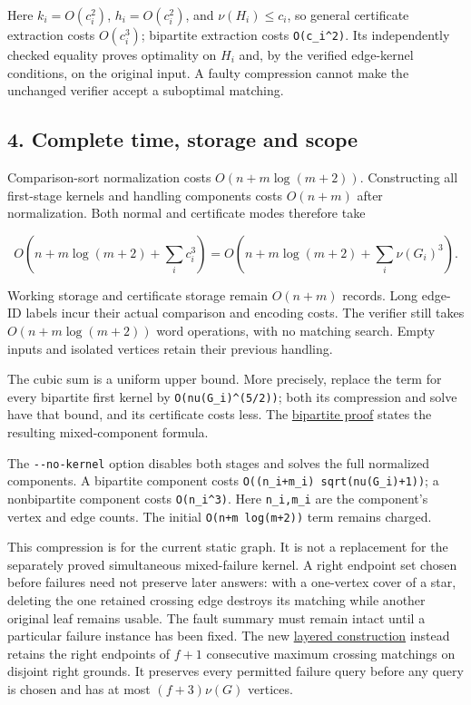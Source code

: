 Here \(k_i=O(c_i^2)\), \(h_i=O(c_i^2)\), and \(\nu(H_i)\leq c_i\), so general certificate extraction costs \(O(c_i^3)\); bipartite extraction costs \texttt{O(c\_i\^{}2)}. Its independently checked equality proves optimality on \(H_i\) and, by the verified edge-kernel conditions, on the original input. A faulty compression cannot make the unchanged verifier accept a suboptimal matching.

\hypertarget{af-e51d4b9b02-complete-time-storage-and-scope}{%
\subsection{4. Complete time, storage and scope}\label{af-e51d4b9b02-complete-time-storage-and-scope}}

Comparison-sort normalization costs \(O(n+m\log(m+2))\). Constructing all first-stage kernels and handling components costs \(O(n+m)\) after normalization. Both normal and certificate modes therefore take

\[
O\!\left(n+m\log(m+2)+\sum_i c_i^3\right)
=O\!\left(n+m\log(m+2)+\sum_i\nu(G_i)^3\right).
\]

Working storage and certificate storage remain \(O(n+m)\) records. Long edge-ID labels incur their actual comparison and encoding costs. The verifier still takes \(O(n+m\log(m+2))\) word operations, with no matching search. Empty inputs and isolated vertices retain their previous handling.

The cubic sum is a uniform upper bound. More precisely, replace the term for every bipartite first kernel by \texttt{O(nu(G\_i)\^{}(5/2))}; both its compression and solve have that bound, and its certificate costs less. The \href{https://github.com/icekylinx/algorithm-frontier/blob/main/problems/general-matching/reference/bipartite-proof.md\#1-graphs-and-the-exact-bound}{bipartite proof} states the resulting mixed-component formula.

The \texttt{-\/-no-kernel} option disables both stages and solves the full normalized components. A bipartite component costs \texttt{O((n\_i+m\_i)\ sqrt(nu(G\_i)+1))}; a nonbipartite component costs \texttt{O(n\_i\^{}3)}. Here \texttt{n\_i,m\_i} are the component's vertex and edge counts. The initial \texttt{O(n+m\ log(m+2))} term remains charged.

This compression is for the current static graph. It is not a replacement for the separately proved simultaneous mixed-failure kernel. A right endpoint set chosen before failures need not preserve later answers: with a one-vertex cover of a star, deleting the one retained crossing edge destroys its matching while another original leaf remains usable. The fault summary must remain intact until a particular failure instance has been fixed. The new \href{https://github.com/icekylinx/algorithm-frontier/blob/main/problems/general-matching/reference/fault-tolerant-cover-compression.md}{layered construction} instead retains the right endpoints of \(f+1\) consecutive maximum crossing matchings on disjoint right grounds. It preserves every permitted failure query before any query is chosen and has at most \((f+3)\nu(G)\) vertices.

